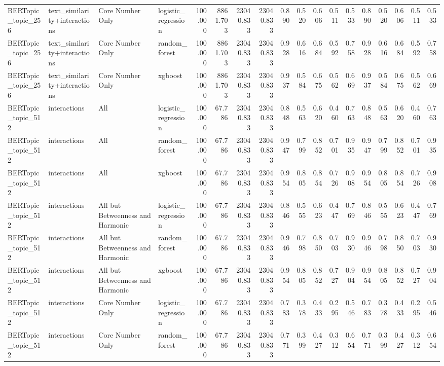 \begin{tabular}{llllrrrrrrrrrrrrrr}
BERTopic_topic_256 & text_similarity+interactions & Core Number Only & logistic_regression & 100.000 & 8861.703 & 23040.833 & 23040.833 & 0.890 & 0.520 & 0.606 & 0.511 & 0.533 & 0.890 & 0.520 & 0.606 & 0.511 & 0.533 \\
BERTopic_topic_256 & text_similarity+interactions & Core Number Only & random_forest & 100.000 & 8861.703 & 23040.833 & 23040.833 & 0.928 & 0.616 & 0.684 & 0.592 & 0.758 & 0.928 & 0.616 & 0.684 & 0.592 & 0.758 \\
BERTopic_topic_256 & text_similarity+interactions & Core Number Only & xgboost & 100.000 & 8861.703 & 23040.833 & 23040.833 & 0.937 & 0.584 & 0.675 & 0.562 & 0.669 & 0.937 & 0.584 & 0.675 & 0.562 & 0.669 \\
BERTopic_topic_512 & interactions & All & logistic_regression & 100.000 & 67.786 & 23040.833 & 23040.833 & 0.848 & 0.563 & 0.620 & 0.460 & 0.763 & 0.848 & 0.563 & 0.620 & 0.460 & 0.763 \\
BERTopic_topic_512 & interactions & All & random_forest & 100.000 & 67.786 & 23040.833 & 23040.833 & 0.947 & 0.799 & 0.852 & 0.701 & 0.935 & 0.947 & 0.799 & 0.852 & 0.701 & 0.935 \\
BERTopic_topic_512 & interactions & All & xgboost & 100.000 & 67.786 & 23040.833 & 23040.833 & 0.954 & 0.805 & 0.854 & 0.726 & 0.908 & 0.954 & 0.805 & 0.854 & 0.726 & 0.908 \\
BERTopic_topic_512 & interactions & All but Betweenness and Harmonic & logistic_regression & 100.000 & 67.786 & 23040.833 & 23040.833 & 0.846 & 0.555 & 0.623 & 0.447 & 0.769 & 0.846 & 0.555 & 0.623 & 0.447 & 0.769 \\
BERTopic_topic_512 & interactions & All but Betweenness and Harmonic & random_forest & 100.000 & 67.786 & 23040.833 & 23040.833 & 0.946 & 0.798 & 0.850 & 0.703 & 0.930 & 0.946 & 0.798 & 0.850 & 0.703 & 0.930 \\
BERTopic_topic_512 & interactions & All but Betweenness and Harmonic & xgboost & 100.000 & 67.786 & 23040.833 & 23040.833 & 0.954 & 0.805 & 0.852 & 0.727 & 0.904 & 0.954 & 0.805 & 0.852 & 0.727 & 0.904 \\
BERTopic_topic_512 & interactions & Core Number Only & logistic_regression & 100.000 & 67.786 & 23040.833 & 23040.833 & 0.783 & 0.378 & 0.433 & 0.295 & 0.546 & 0.783 & 0.378 & 0.433 & 0.295 & 0.546 \\
BERTopic_topic_512 & interactions & Core Number Only & random_forest & 100.000 & 67.786 & 23040.833 & 23040.833 & 0.771 & 0.399 & 0.427 & 0.312 & 0.654 & 0.771 & 0.399 & 0.427 & 0.312 & 0.654 \\

\end{tabular}
